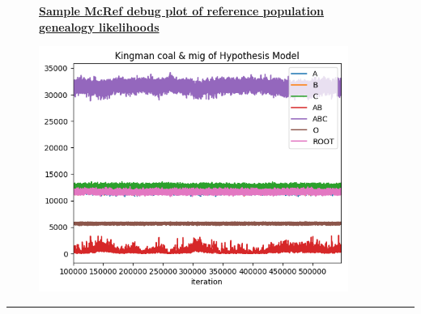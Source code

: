 \documentclass[11pt]{article}
\newcommand{\1}{\mathbbm{1}}
\newcommand{\figuretitle}[1]{
	\centering
	\underline{\textbf{#1}}
	\par
	\medskip
}
\begin{document}
\begin{figure}[H]
\figuretitle{Sample McRef debug plot of reference population genealogy likelihoods}
\includegraphics[width=0.9\textwidth]{appendix/hyp_ln_ld_line}
\label{fig:sample_McRef_output}
\end{figure}

\noindent\rule{16cm}{0.4pt}
\end{document}
